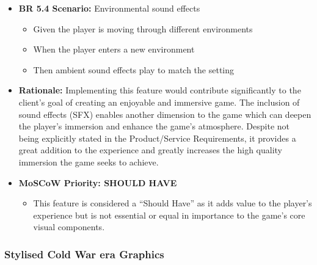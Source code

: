 \documentclass[11pt, a4paper]{article}
\begin{document}
\begin{itemize}
    \item \textbf{BR 5.4 Scenario:} Environmental sound effects

          \begin{itemize}
              \item Given the player is moving through different environments
              \item When the player enters a new environment
              \item Then ambient sound effects play to match the setting
          \end{itemize}

    \item \textbf{Rationale:} Implementing this feature would contribute significantly to the client’s goal of creating an enjoyable and immersive game. The inclusion of sound effects (SFX) enables another dimension to the game which can deepen the player’s immersion and enhance the game’s atmosphere. Despite not being explicitly stated in the Product/Service Requirements, it provides a great addition to the experience and greatly increases the high quality immersion the game seeks to achieve.

    \item \textbf{MoSCoW Priority: SHOULD HAVE}

          \begin{itemize}
              \item This feature is considered a “Should Have” as it adds value to the player’s experience but is not essential or equal in importance to the game’s core visual components.
          \end{itemize}
\end{itemize}

\newpage

\subsubsection{Stylised Cold War era Graphics}
\end{document}
